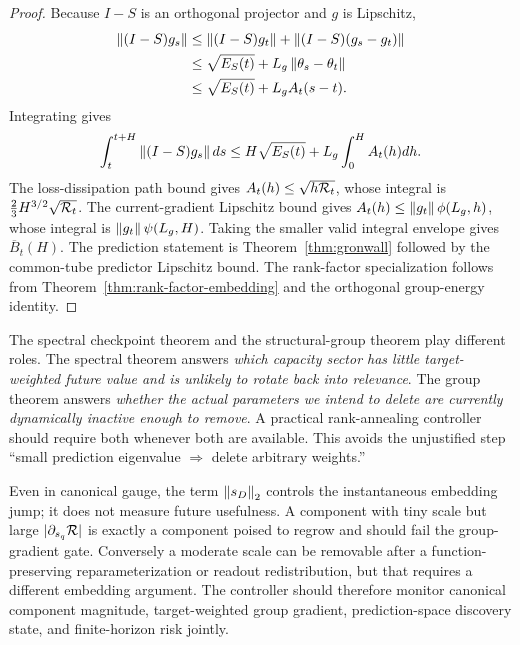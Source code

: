 \begin{proof}
Because $I-S$ is an orthogonal projector and $g$ is Lipschitz,
\[
\begin{aligned}
\left\lVert (I-S)g_s\right\rVert
&\le
\left\lVert (I-S)g_t\right\rVert
+\left\lVert (I-S)(g_s-g_t)\right\rVert\\
&\le
\sqrt{E_S(t)}+L_g\left\lVert \theta_s-\theta_t\right\rVert\\
&\le
\sqrt{E_S(t)}+L_gA_t(s-t).
\end{aligned}
\]
Integrating gives
\[
\int_t^{t+H}\left\lVert (I-S)g_s\right\rVert ds
\le H\sqrt{E_S(t)}+L_g\int_0^H A_t(h)dh.
\]
The loss-dissipation path bound gives $A_t(h)\le\sqrt{h\mathcal R_t}$, whose integral is $\frac23H^{3/2}\sqrt{\mathcal R_t}$. The current-gradient Lipschitz bound gives
$A_t(h)\le\left\lVert g_t\right\rVert\phi(L_g,h)$, whose integral is $\left\lVert g_t\right\rVert\psi(L_g,H)$. Taking the smaller valid integral envelope gives $\overline B_t(H)$. The prediction statement is Theorem~\ref{thm:gronwall} followed by the common-tube predictor Lipschitz bound. The rank-factor specialization follows from Theorem~\ref{thm:rank-factor-embedding} and the orthogonal group-energy identity.
\end{proof}

\begin{remark}
The spectral checkpoint theorem and the structural-group theorem play different roles. The spectral theorem answers \emph{which capacity sector has little target-weighted future value and is unlikely to rotate back into relevance}. The group theorem answers \emph{whether the actual parameters we intend to delete are currently dynamically inactive enough to remove}. A practical rank-annealing controller should require both whenever both are available. This avoids the unjustified step ``small prediction eigenvalue $\Rightarrow$ delete arbitrary weights.''
\end{remark}

\begin{remark}
Even in canonical gauge, the term $\left\lVert s_D\right\rVert_2$ controls the instantaneous embedding jump; it does not measure future usefulness. A component with tiny scale but large $|\partial_{s_q}\mathcal R|$ is exactly a component poised to regrow and should fail the group-gradient gate. Conversely a moderate scale can be removable after a function-preserving reparameterization or readout redistribution, but that requires a different embedding argument. The controller should therefore monitor canonical component magnitude, target-weighted group gradient, prediction-space discovery state, and finite-horizon risk jointly.
\end{remark}
